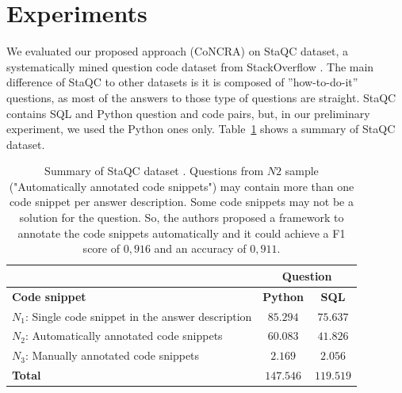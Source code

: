 \documentclass[sigconf]{acmart}
\begin{document}
\section{Experiments}

We evaluated our proposed approach (CoNCRA) on StaQC dataset, a systematically mined question code dataset from StackOverflow \cite{yao-2018}. The main difference of StaQC to other datasets is it is composed of ''how-to-do-it'' questions, as most of the answers to those type of questions are straight. StaQC contains SQL and Python question and code pairs, but, in our preliminary experiment, we used the Python ones only. Table~\ref{table:summary-training-data-yao-staqc} shows a summary of StaQC dataset.

\begin{table}[h]
\centering
\begin{tabular}{ p{5cm} c c }
\hline
  & \multicolumn{2}{c}{\textbf{Question}}\\
\hline
\textbf{Code snippet} & \textbf{Python} & \textbf{SQL}  \\
\hline

$N_{1}$: Single code snippet in the answer description & $85.294$ & $75.637$ \\

$N_{2}$: Automatically annotated code snippets & $60.083$ & $41.826$ \\

$N_{3}$: Manually annotated code snippets & $2.169$ & $2.056$  \\

 \hline
 \textbf{Total} & $\bm{147.546}$ & $\bm{119.519}$\\
 \hline 
 
\end{tabular}
\caption{Summary of StaQC dataset \cite{yao-2018}. Questions from $N2$ sample ("Automatically annotated code snippets") may contain more than one code snippet per answer description. Some code snippets may not be a solution for the question. So, the authors proposed a framework to annotate the code snippets automatically and it could achieve a F1 score of $0,916$ and an accuracy of $0,911$.}
\label{table:summary-training-data-yao-staqc}
\end{table}
\end{document}
